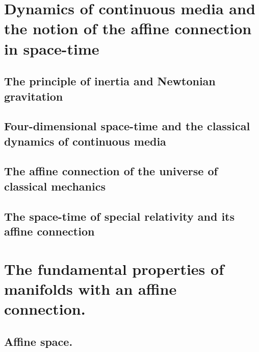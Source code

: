 \documentclass{report}
\begin{document}
\chapter{Dynamics of continuous media and the notion of the affine connection in space-time}

\section*{The principle of inertia and Newtonian gravitation}








\section*{Four-dimensional space-time and the classical dynamics of continuous media}










\section*{The affine connection of the universe of classical mechanics}






\section*{The space-time of special relativity and its affine connection}









\chapter{The fundamental properties of manifolds with an affine connection.}

\section*{Affine space.}
\end{document}

